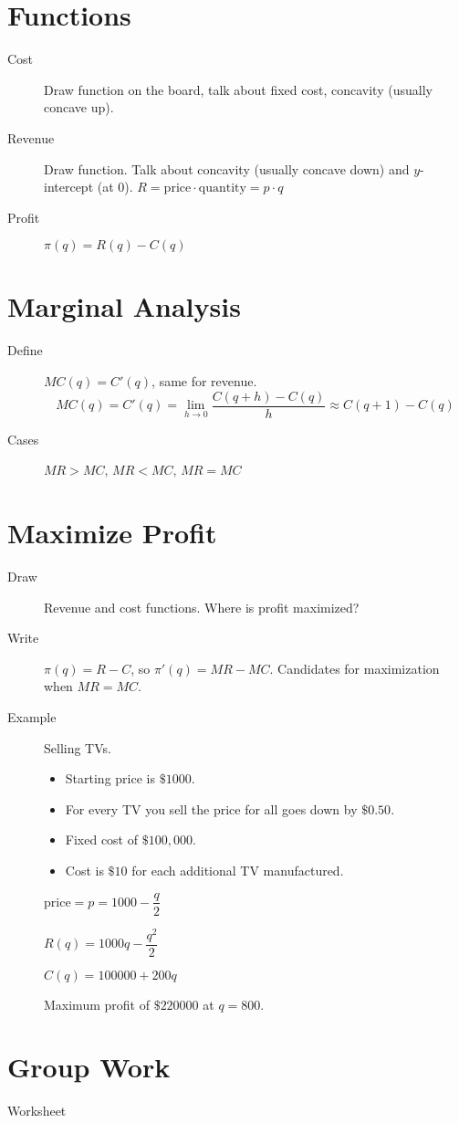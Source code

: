 \documentclass[11pt]{article}
\begin{document}
\drawtitle

\section*{Functions}
\begin{description}
\item[Cost] Draw function on the board, talk about fixed cost,
  concavity (usually concave up).
\item[Revenue] Draw function.  Talk about concavity (usually concave
  down) and $y$-intercept (at 0). $R=\text{price}\cdot\text{quantity}
  = p\cdot q$
\item[Profit] $\pi(q) = R(q) - C(q)$
\end{description}

\section*{Marginal Analysis}
\begin{description}
\item[Define] $MC(q)=C'(q)$, same for revenue.
  \[
  MC(q) = C'(q) = \lim_{h\to 0} \frac{C(q+h)-C(q)}{h} \approx C(q+1) - C(q)
  \]
\item[Cases] $MR>MC$, $MR<MC$, $MR=MC$
\end{description}

\section*{Maximize Profit}
\begin{description}
\item[Draw] Revenue and cost functions.  Where is profit maximized?
\item[Write] $\pi(q)=R-C$, so $\pi'(q)=MR-MC$.  Candidates for
  maximization when $MR=MC$.
\item[Example] Selling TVs.
  \begin{itemize}
  \item Starting price is $\$1000$.
  \item For every TV you sell the price for all goes down by $\$0.50$.
  \item Fixed cost of $\$100,000$.
  \item Cost is $\$10$ for each additional TV manufactured.
  \end{itemize}

  $\text{price} = p=1000-\dfrac{q}{2}$

  $R(q)=1000q-\dfrac{q^2}{2}$
  
  $C(q)=100000+200q$
  
  Maximum profit of $\$220000$ at $q=800$.
\end{description}

\section*{Group Work}
\begin{description}
\item[Worksheet]
\end{description}
\end{document}
